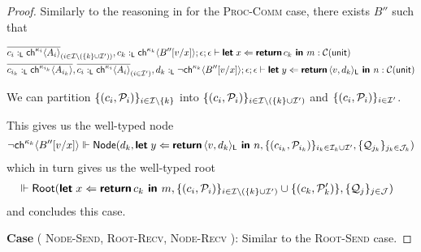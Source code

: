 \begin{proof}
  \noindent
  Similarly to the reasoning in  for the 
  \textsc{Proc-Comm} case, there exists $B''$ such that
  \begin{small}
  \begin{align*}
    &\overline{c_i :_{\textsf{L}} \textsf{ch}^{\kappa_i}\langle{A_i}\rangle}_{(i \in \mathcal{I} \setminus (\{k\} \cup \mathcal{I}'))}, 
     c_k :_{\textsf{L}} \textsf{ch}^{\kappa_k}\langle{B''[v/x]}\rangle ; \epsilon ; \epsilon \vdash 
     \textbf{\textsf{let}}\;{x}\Leftarrow{\textbf{\textsf{return}}\,{c_k}}\textbf{\textsf{ in }}{m} : \mathcal{C}({\textsf{unit}})
    \\
    &\overline{c_{i_k} :_{\textsf{L}} \textsf{ch}^{\kappa_{i_k}}\langle{A_{i_k}}\rangle},
     \overline{c_i :_{\textsf{L}} \textsf{ch}^{\kappa_i}\langle{A_i}\rangle}_{(i \in \mathcal{I}')},
     d_k :_{\textsf{L}} \neg{\textsf{ch}^{\kappa_k}\langle{B''[v/x]}\rangle} ; \epsilon ; \epsilon \vdash
     \textbf{\textsf{let}}\;{y}\Leftarrow{\textbf{\textsf{return}}\,{\langle{{v},{d_k}}\rangle_{\textsf{L}}}}\textbf{\textsf{ in }}{n} : \mathcal{C}({\textsf{unit}})
  \end{align*}
  \end{small}

  \noindent
  We can partition $\{ ( c_i, \mathcal{P}_i ) \}_{i \in \mathcal{I} \setminus \{k\}}$ into
  $\{ ( c_i, \mathcal{P}_i ) \}_{i \in \mathcal{I} \setminus (\{ k \} \cup \mathcal{I}')}$ and
  $\{ ( c_{i}, \mathcal{P}_{i} ) \}_{i \in \mathcal{I}'}$.

  \noindent
  This gives us the well-typed node
  \begin{align*}
    \neg{\textsf{ch}^{\kappa_k}\langle{B''[v/x]}\rangle} \Vdash
    \textsf{Node}({d_k}, {
      \textbf{\textsf{let}}\;{y}\Leftarrow{\textbf{\textsf{return}}\,{\langle{{v},{d_k}}\rangle_{\textsf{L}}}}\textbf{\textsf{ in }}{n}
    }, {
      \{ ( c_{i_k}, \mathcal{P}_{i_k} ) \}_{i_k \in \mathcal{I}_k \cup \mathcal{I}'},
      \{ \mathcal{Q}_{j_k} \}_{j_k \in \mathcal{J}_k}
    })
  \end{align*}
  which in turn gives us the well-typed root
  \begin{align*}
    &\Vdash \textsf{Root}({
      \textbf{\textsf{let}}\;{x}\Leftarrow{
        \textbf{\textsf{return}}\,{c_k}
      }\textbf{\textsf{ in }}{m} 
    }, {
      \{ (c_i, \mathcal{P}_i) \}_{i \in \mathcal{I} \setminus (\{ k \} \cup \mathcal{I}')} \cup \{ (c_k, \mathcal{P}_k') \},
      \{ \mathcal{Q}_j \}_{j \in \mathcal{J}}
    })
  \end{align*}
  and concludes this case.

\noindent
\textbf{Case} (
  \textsc{Node-Send}, 
  \textsc{Root-Recv}, 
  \textsc{Node-Recv}
): Similar to the \textsc{Root-Send} case.


\end{proof}
